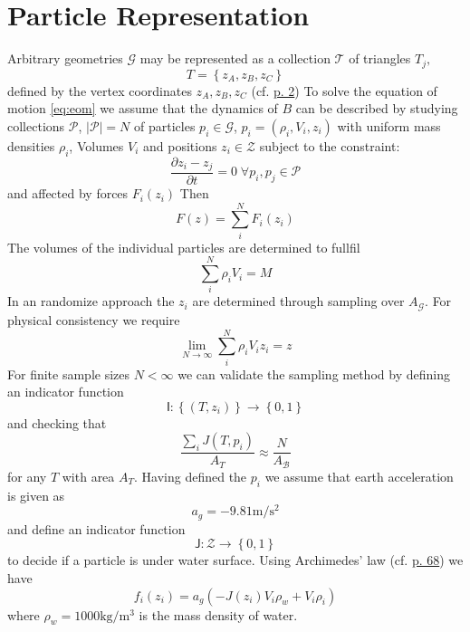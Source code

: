 \section{Particle Representation}
Arbitrary geometries $\mathcal{G}$ may be represented as a collection $\mathcal{T}$ of triangles $T_j,$
$$T = \left\{z_A, z_B, z_C\right\}$$
defined by the vertex coordinates $z_A, z_B, z_C$
(cf.  \href{Burkardt-ComputationalGeometryLab-01-Triangles.pdf}{p. 2})
To solve the equation of motion \ref{eq:eom} we assume that the dynamics of $B$ can be described by studying collections $\mathcal{P}$, $|\mathcal{P}| = N$ of particles $p_i \in \mathcal{G}$, $p_i = \left(\rho_i, V_i, z_i\right)$ with uniform mass densities $\rho_i$, Volumes $V_i$ and positions $z_i \in \mathcal{Z}$ subject to the constraint:
$$\frac{\partial z_i - z_j}{\partial t} = 0 \; \forall p_i, p_j \in \mathcal{P}$$
and affected by forces $F_i(z_i)$
Then
$$F(z) = \sum\limits_i^N F_i(z_i)$$
The volumes of the individual particles are determined to fullfil
$$\sum\limits_i^N \rho_i V_i = M$$
In an randomize approach the $z_i$ are determined through sampling over $A_\mathcal{G}$.  For physical consistency we require
$$\lim\limits_{N \to \infty} \sum\limits_i^N \rho_i V_i z_i = z$$
For finite sample sizes $N < \infty$ we can validate the sampling method by defining an indicator function 
\begin{equation}
\mathsf{I}: \left\{(T, z_i)\right\} \to \left\{0, 1\right\}
\label{eq:in}
\end{equation}
and checking that
$$\frac{\sum\limits_i J(T, p_i)}{A_T} \approx \frac{N}{A_{\mathcal{B}}}$$
for any $T$ with area $A_T$.  
Having defined the $p_i$ we assume that earth acceleration is given as
$$a_g = - \num{9.81}  \si{\metre\per\square\second}$$ 
and define an indicator function 
$$\mathsf{J}: \mathcal{Z} \to \left\{ 0, 1\right\}$$
to decide if a particle is under water surface.  
Using Archimedes' law
(cf.  \href{LautrupPhysicsOfContinuousMatter}{p. 68})
we have 
$$f_i(z_i) = a_g(- J(z_i) V_i \rho_w + V_i \rho_i)$$
where $\rho_w = \num{1000} \si{\kilo\gram\per\cubic\metre}$ is the mass density of water.


